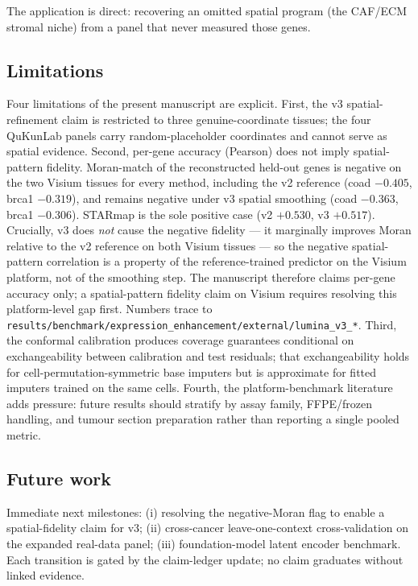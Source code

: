 \documentclass[10pt,letterpaper]{article}
\begin{document}
The application is direct: recovering an omitted spatial program (the CAF/ECM stromal
niche) from a panel that never measured those genes.

\subsection{Limitations}

Four limitations of the present manuscript are explicit.
First, the v3 spatial-refinement claim is restricted to three genuine-coordinate
tissues; the four QuKunLab panels carry random-placeholder coordinates and cannot
serve as spatial evidence.
Second, per-gene accuracy (Pearson) does not imply spatial-pattern fidelity.
Moran-match of the reconstructed held-out genes is negative on the two Visium
tissues for every method, including the v2 reference (coad $-0.405$, brca1 $-0.319$),
and remains negative under v3 spatial smoothing (coad $-0.363$, brca1 $-0.306$).
STARmap is the sole positive case (v2 $+0.530$, v3 $+0.517$).
Crucially, v3 does \emph{not} cause the negative fidelity --- it marginally improves
Moran relative to the v2 reference on both Visium tissues --- so the negative
spatial-pattern correlation is a property of the reference-trained predictor on the
Visium platform, not of the smoothing step.
The manuscript therefore claims per-gene accuracy only; a spatial-pattern fidelity
claim on Visium requires resolving this platform-level gap first.
Numbers trace to
\texttt{results/benchmark/expression\_enhancement/external/lumina\_v3\_*}.
Third, the conformal calibration produces coverage guarantees conditional on
exchangeability between calibration and test residuals; that exchangeability holds for
cell-permutation-symmetric base imputers but is approximate for fitted imputers trained
on the same cells.
Fourth, the platform-benchmark
literature~\cite{You2024SequencingST,Cervilla2026SixCancerPlatforms,%
Wang2025ImagingFFPE,Rademacher2025TumorST} adds pressure: future results should
stratify by assay family, FFPE/frozen handling, and tumour section preparation rather
than reporting a single pooled metric.

\subsection{Future work}

Immediate next milestones: (i) resolving the negative-Moran flag to enable a
spatial-fidelity claim for v3; (ii) cross-cancer leave-one-context cross-validation
on the expanded real-data panel; (iii) foundation-model latent encoder benchmark. Each
transition is gated by the claim-ledger update; no claim graduates without linked
evidence.
\end{document}
